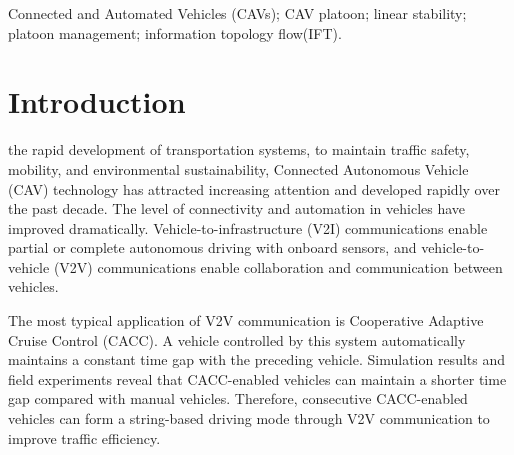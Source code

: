 \documentclass[journal]{IEEEtran}
\begin{document}
\begin{IEEEkeywords}
Connected and Automated Vehicles (CAVs); CAV platoon; linear stability; platoon management; information topology flow(IFT).
\end{IEEEkeywords}






%
\IEEEpeerreviewmaketitle



\section{Introduction}
\label{Section 1}
% 
% 
% 
% 
 the rapid development of transportation systems, to maintain traffic safety, mobility, and environmental sustainability, Connected Autonomous Vehicle (CAV) technology has attracted increasing attention and developed rapidly over the past decade. The level of connectivity and automation in vehicles have improved dramatically. Vehicle-to-infrastructure (V2I) communications enable partial or complete autonomous driving with onboard sensors, and vehicle-to-vehicle (V2V) communications enable collaboration and communication between vehicles.\citep{wang2019survey}


The most typical application of V2V communication is Cooperative Adaptive Cruise Control (CACC). A vehicle controlled by this system automatically maintains a constant time gap with the preceding vehicle. Simulation results and field experiments reveal that CACC-enabled vehicles can maintain a shorter time gap compared with manual vehicles. Therefore, consecutive CACC-enabled vehicles can form a string-based driving mode through V2V communication to improve traffic efficiency.\citep{shladover2015cooperative}\citep{wang2020controllability}
\end{document}
